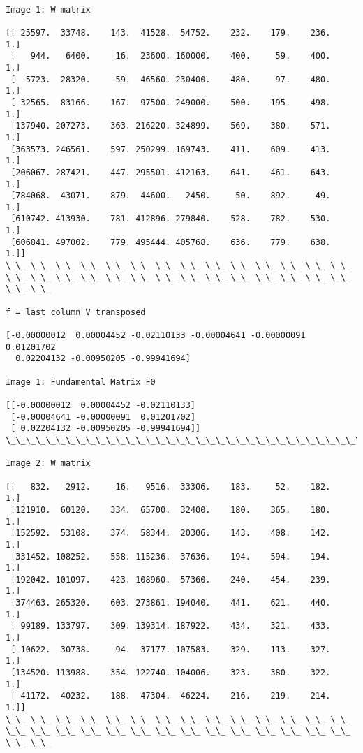 \documentclass[11pt]{article}
\begin{document}
    \begin{Verbatim}[commandchars=\\\{\}]

Image 1: W matrix

[[ 25597.  33748.    143.  41528.  54752.    232.    179.    236.      1.]
 [   944.   6400.     16.  23600. 160000.    400.     59.    400.      1.]
 [  5723.  28320.     59.  46560. 230400.    480.     97.    480.      1.]
 [ 32565.  83166.    167.  97500. 249000.    500.    195.    498.      1.]
 [137940. 207273.    363. 216220. 324899.    569.    380.    571.      1.]
 [363573. 246561.    597. 250299. 169743.    411.    609.    413.      1.]
 [206067. 287421.    447. 295501. 412163.    641.    461.    643.      1.]
 [784068.  43071.    879.  44600.   2450.     50.    892.     49.      1.]
 [610742. 413930.    781. 412896. 279840.    528.    782.    530.      1.]
 [606841. 497002.    779. 495444. 405768.    636.    779.    638.      1.]]
\_\_ \_\_ \_\_ \_\_ \_\_ \_\_ \_\_ \_\_ \_\_ \_\_ \_\_ \_\_ \_\_ \_\_ \_\_ \_\_ \_\_ \_\_ \_\_ \_\_ \_\_ \_\_ \_\_ \_\_ \_\_ \_\_ \_\_ \_\_ \_\_ \_\_

f = last column V transposed 

[-0.00000012  0.00004452 -0.02110133 -0.00004641 -0.00000091  0.01201702
  0.02204132 -0.00950205 -0.99941694]

Image 1: Fundamental Matrix F0

[[-0.00000012  0.00004452 -0.02110133]
 [-0.00004641 -0.00000091  0.01201702]
 [ 0.02204132 -0.00950205 -0.99941694]]
\_\_\_\_\_\_\_\_\_\_\_\_\_\_\_\_\_\_\_\_\_\_\_\_\_\_\_\_\_\_\_\_\_\_\_\_\_\_\_\_\_\_\_\_\_\_\_\_\_\_\_\_\_\_\_\_\_\_\_\_\_\_\_\_\_\_\_\_\_\_\_\_\_\_\_\_\_\_\_\_\_\_\_\_

Image 2: W matrix

[[   832.   2912.     16.   9516.  33306.    183.     52.    182.      1.]
 [121910.  60120.    334.  65700.  32400.    180.    365.    180.      1.]
 [152592.  53108.    374.  58344.  20306.    143.    408.    142.      1.]
 [331452. 108252.    558. 115236.  37636.    194.    594.    194.      1.]
 [192042. 101097.    423. 108960.  57360.    240.    454.    239.      1.]
 [374463. 265320.    603. 273861. 194040.    441.    621.    440.      1.]
 [ 99189. 133797.    309. 139314. 187922.    434.    321.    433.      1.]
 [ 10622.  30738.     94.  37177. 107583.    329.    113.    327.      1.]
 [134520. 113988.    354. 122740. 104006.    323.    380.    322.      1.]
 [ 41172.  40232.    188.  47304.  46224.    216.    219.    214.      1.]]
\_\_ \_\_ \_\_ \_\_ \_\_ \_\_ \_\_ \_\_ \_\_ \_\_ \_\_ \_\_ \_\_ \_\_ \_\_ \_\_ \_\_ \_\_ \_\_ \_\_ \_\_ \_\_ \_\_ \_\_ \_\_ \_\_ \_\_ \_\_ \_\_ \_\_


\end{Verbatim}
\end{document}
